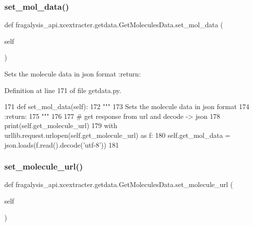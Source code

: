 \subsubsection{\texorpdfstring{set\+\_\+mol\+\_\+data()}{set\_mol\_data()}}
{\footnotesize\ttfamily def fragalysis\+\_\+api.\+xcextracter.\+getdata.\+Get\+Molecules\+Data.\+set\+\_\+mol\+\_\+data (\begin{DoxyParamCaption}\item[{}]{self }\end{DoxyParamCaption})}

\begin{DoxyVerb}Sets the molecule data in json format
:return:
\end{DoxyVerb}
 

Definition at line 171 of file getdata.\+py.


\begin{DoxyCode}
171     \textcolor{keyword}{def }set\_mol\_data(self):
172         \textcolor{stringliteral}{"""}
173 \textcolor{stringliteral}{        Sets the molecule data in json format}
174 \textcolor{stringliteral}{        :return:}
175 \textcolor{stringliteral}{        """}
176 
177         \textcolor{comment}{# get response from url and decode -> json}
178         print(self.get\_molecule\_url)
179         with urllib.request.urlopen(self.get\_molecule\_url) \textcolor{keyword}{as} f:
180             self.get\_mol\_data = json.loads(f.read().decode(\textcolor{stringliteral}{'utf-8'}))
181 
\end{DoxyCode}
\mbox{\label{classfragalysis__api_1_1xcextracter_1_1getdata_1_1_get_molecules_data_a61f7510bc705fab0ee33128872619f40}} 
\subsubsection{\texorpdfstring{set\+\_\+molecule\+\_\+url()}{set\_molecule\_url()}}
{\footnotesize\ttfamily def fragalysis\+\_\+api.\+xcextracter.\+getdata.\+Get\+Molecules\+Data.\+set\+\_\+molecule\+\_\+url (\begin{DoxyParamCaption}\item[{}]{self }\end{DoxyParamCaption})}

